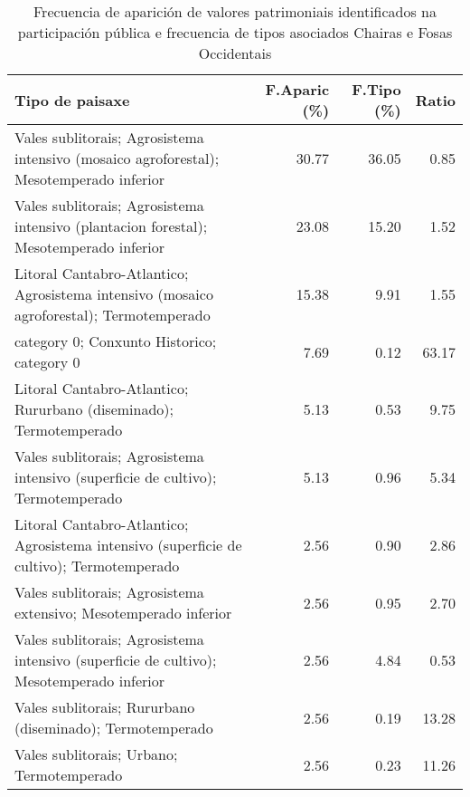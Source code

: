\begin{table}[p]
\centering
\caption{Frecuencia de aparición de valores patrimoniais identificados na participación pública e frecuencia de tipos asociados Chairas e Fosas Occidentais} 
\label{vsixotpat11}
\begin{tabular}{lrrr}
  \hline
Tipo de paisaxe & F.Aparic (\%) & F.Tipo (\%) & Ratio \\ 
  \hline
Vales sublitorais; Agrosistema intensivo (mosaico agroforestal); Mesotemperado inferior & 30.77 & 36.05 & 0.85 \\ 
  Vales sublitorais; Agrosistema intensivo (plantacion forestal); Mesotemperado inferior & 23.08 & 15.20 & 1.52 \\ 
  Litoral Cantabro-Atlantico; Agrosistema intensivo (mosaico agroforestal); Termotemperado & 15.38 & 9.91 & 1.55 \\ 
  category 0; Conxunto Historico; category 0 & 7.69 & 0.12 & 63.17 \\ 
  Litoral Cantabro-Atlantico; Rururbano (diseminado); Termotemperado & 5.13 & 0.53 & 9.75 \\ 
  Vales sublitorais; Agrosistema intensivo (superficie de cultivo); Termotemperado & 5.13 & 0.96 & 5.34 \\ 
  Litoral Cantabro-Atlantico; Agrosistema intensivo (superficie de cultivo); Termotemperado & 2.56 & 0.90 & 2.86 \\ 
  Vales sublitorais; Agrosistema extensivo; Mesotemperado inferior & 2.56 & 0.95 & 2.70 \\ 
  Vales sublitorais; Agrosistema intensivo (superficie de cultivo); Mesotemperado inferior & 2.56 & 4.84 & 0.53 \\ 
  Vales sublitorais; Rururbano (diseminado); Termotemperado & 2.56 & 0.19 & 13.28 \\ 
  Vales sublitorais; Urbano; Termotemperado & 2.56 & 0.23 & 11.26 \\ 
   \hline
\end{tabular}
\end{table}
